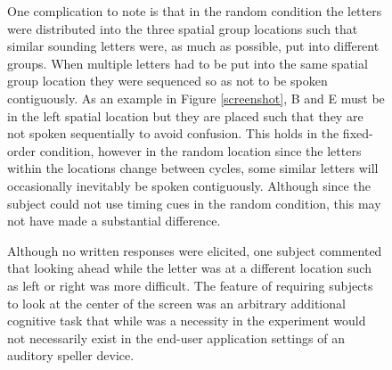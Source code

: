 \documentclass[10pt]{article}
\begin{document}
\begin{figure}
One complication to note is that in the random condition the
letters were distributed into the three spatial group
locations such that similar sounding letters were, as much as
possible, put into different groups. When multiple letters had
to be put into the same spatial group location they were
sequenced so as not to be spoken contiguously.  As an example
in Figure \ref{screenshot}, B and E must be in the left
spatial location but they are placed such that they are not
spoken sequentially to avoid confusion.  This holds in the
fixed-order condition, however in the random location since
the letters within the locations change between cycles, some
similar letters will occasionally inevitably be spoken contiguously.
Although since the subject could not use timing cues in the
random condition, this may not have made a substantial
difference. 


Although no written responses were elicited, one subject commented that looking ahead while the letter was at a
different location such as left or right was more difficult.  The
feature of requiring subjects to look at the center of the screen
was an arbitrary additional cognitive task that while
was a necessity in the experiment would not necessarily exist in the
end-user application settings of an auditory speller device.




\end{figure}
\end{document}
